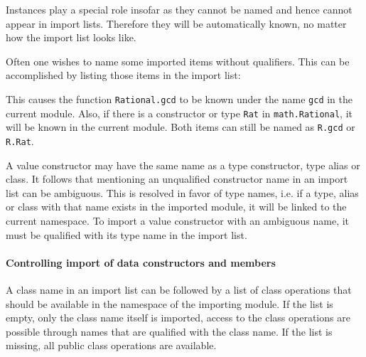 Instances play a special role insofar as they cannot be named and hence cannot appear in import lists. 
Therefore they will be automatically known, no matter how the import list looks like.  

Often one wishes to name some imported items without qualifiers. This
can be accomplished by listing those items in the import list:


This causes the function {\tt Rational.gcd} to be known under the
name {\tt gcd} in the current module. Also, if there is a constructor
or type {\tt Rat} in {\tt math.Rational}, it will be known in the
current module. Both items can still be named as {\tt R.gcd} or {\tt
R.Rat}.

A value constructor may have the same name as a type constructor, type alias or class. 
It follows that mentioning an unqualified constructor name in an import list can be ambiguous. 
This is resolved in favor of type names, i.e. if a type, alias  or class with that name exists in the imported module, 
it will be linked to the current namespace. 
To import a value constructor with an ambiguous name, it must be qualified with its type name in the import list.

\paragraph*{Controlling import of data constructors and members}

A class name in an import list can be followed by a list of class operations that should be available in the namespace of the importing module. If the list is empty, only the class name itself is imported, access to the class operations are possible through names that are qualified with the class name. If the list is missing, all public class operations are available. 


